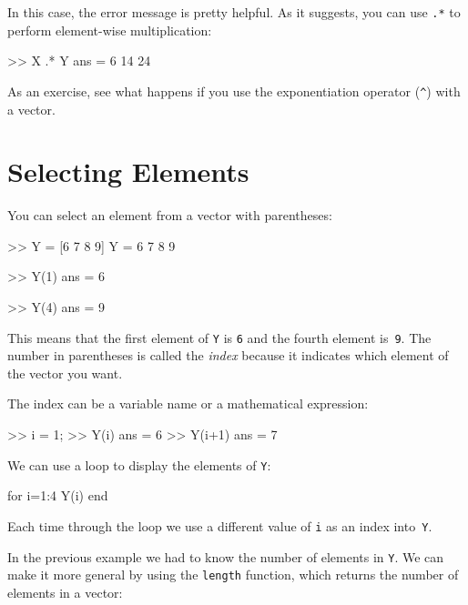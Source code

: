In this case, the error message is pretty helpful.  As it suggests, you can use \lstinline{.*} to perform element-wise multiplication:


\begin{code}
>> X .* Y
ans = 6    14    24
\end{code}

As an exercise, see what happens if you use the exponentiation operator
(\lstinline{^}) with a vector.

\section{Selecting Elements}


You can select an element from a vector with parentheses:

\begin{code}
>> Y = [6 7 8 9]
Y = 6    7     8     9

>> Y(1)
ans = 6

>> Y(4)
ans = 9
\end{code}

This means that the first element of \lstinline{Y} is \lstinline{6} and the
fourth element is~\lstinline{9}.
The number in parentheses is called the \emph{index} because it indicates which element of the vector you want.


The index can be a variable name or a mathematical expression:

\begin{code}
>> i = 1;
>> Y(i)
ans = 6
>> Y(i+1)
ans = 7
\end{code}

We can use a loop to display the elements of \lstinline{Y}:


\begin{code}
for i=1:4
     Y(i)
end
\end{code}

Each time through the loop we use a different value of \lstinline{i}
as an index into~\lstinline{Y}.


In the previous example we had to know the number
of elements in \lstinline{Y}.  We can make it more general by using
the \lstinline{length} function, which returns the number of elements
in a vector:

